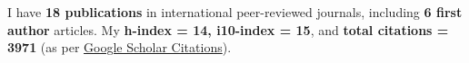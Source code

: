 \hfill
\par
I have \textbf{18 publications} in international peer-reviewed journals, including \textbf{6 first author} articles. My \textbf{h-index = 14, i10-index = 15}, and \textbf{total citations = 3971} (as per \href{https://scholar.google.com/citations?hl=en&user=6-7FYjIAAAAJ&authuser=2}{Google Scholar Citations}).

\nocite{*}


\printbibliography[heading={none},title={Published},type=article]



